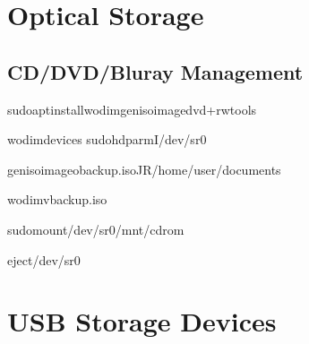 \documentclass[letterpaper,10pt,english]{sphinxmanual}
\begin{document}
\section{Optical Storage}
\label{\detokenize{storage-devices:optical-storage}}

\subsection{CD/DVD/Blu\sphinxhyphen{}ray Management}
\label{\detokenize{storage-devices:cd-dvd-blu-ray-management}}
\begin{sphinxVerbatim}[commandchars=\\\{\}]
sudoaptinstallwodimgenisoimagedvd+rw\PYGZhy{}tools

wodim\PYGZhy{}\PYGZhy{}devices
sudohdparm\PYGZhy{}I/dev/sr0

genisoimage\PYGZhy{}obackup.iso\PYGZhy{}J\PYGZhy{}R/home/user/documents

wodim\PYGZhy{}vbackup.iso

sudomount/dev/sr0/mnt/cdrom

eject/dev/sr0
\end{sphinxVerbatim}


\section{USB Storage Devices}
\label{\detokenize{storage-devices:usb-storage-devices}}
\end{document}
